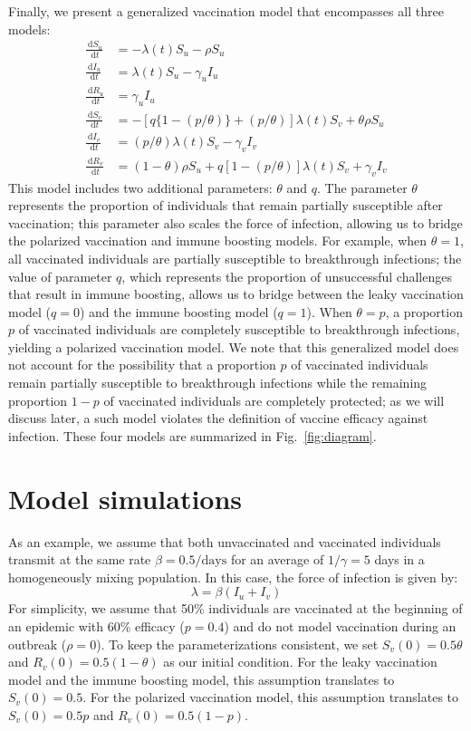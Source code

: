 \documentclass[12pt]{article}
\newcommand{\fref}[1]{Fig.~\ref{fig:#1}}
\newcommand{\dd}[1]{\ensuremath{\, \mathrm{d}#1}}
\begin{document}
Finally, we present a generalized vaccination model that encompasses all three models:
\begin{align}
\frac{\dd S_u}{\dd t} &= - \lambda(t) S_u - \rho S_u \\
\frac{\dd I_u}{\dd t} &= \lambda(t) S_u - \gamma_u I_u \\
\frac{\dd R_u}{\dd t} &= \gamma_u I_u \\
\frac{\dd S_v}{\dd t} &= - [q \{1-(p/\theta)\} + (p/\theta)] \lambda(t) S_v + \theta \rho S_u \\
\frac{\dd I_v}{\dd t} &= (p/\theta) \lambda(t) S_v - \gamma_v I_v \\
\frac{\dd R_v}{\dd t} &= (1 - \theta) \rho S_u + q [1-(p/\theta)] \lambda(t) S_v + \gamma_v I_v
\end{align}
This model includes two additional parameters: $\theta$ and $q$.
The parameter $\theta$ represents the proportion of individuals that remain partially susceptible after vaccination;
this parameter also scales the force of infection, allowing us to bridge the polarized vaccination and immune boosting models.
For example, when $\theta = 1$, all vaccinated individuals are partially susceptible to breakthrough infections;
the value of parameter $q$, which represents the proportion of unsuccessful challenges that result in immune boosting, allows us to bridge between the leaky vaccination model ($q=0$) and the immune boosting model ($q = 1$).
When $\theta = p$, a proportion $p$ of vaccinated individuals are completely susceptible to breakthrough infections, yielding a polarized vaccination model.
We note that this generalized model does not account for the possibility that a proportion $p$ of vaccinated individuals remain partially susceptible to breakthrough infections while the remaining proportion $1-p$ of vaccinated individuals are completely protected; 
as we will discuss later, a such model violates the definition of vaccine efficacy against infection.
These four models are summarized in \fref{diagram}.

\section*{Model simulations}

As an example, we assume that both unvaccinated and vaccinated individuals transmit at the same rate $\beta=0.5/\mathrm{days}$ for an average of $1/\gamma=5$ days in a homogeneously mixing population. In this case, the force of infection is given by:
\begin{equation}
\lambda = \beta (I_u + I_v)
\end{equation}
For simplicity, we assume that 50\% individuals are vaccinated at the beginning of an epidemic with 60\% efficacy ($p=0.4$) and do not model vaccination during an outbreak ($\rho = 0$).
To keep the parameterizations consistent, we set $S_v(0) = 0.5 \theta$ and $R_v(0) = 0.5 (1-\theta)$ as our initial condition.
For the leaky vaccination model and the immune boosting model, this assumption translates to $S_v(0) = 0.5$.
For the polarized vaccination model, this assumption translates to $S_v(0) = 0.5 p$ and $R_v(0) = 0.5 (1-p)$.
\end{document}
